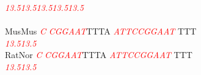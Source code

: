 \documentclass[11pt,twoside,reqno,a4paper]{article}
\begin{document}
{\hspace*{7\charwidth}\hspace*{1\charwidth}\textit{\textcolor{red}{13.5}}\hspace*{1\charwidth}\hspace*{10\charwidth}\textit{\textcolor{red}{13.5}}\hspace*{1\charwidth}\hspace*{10\charwidth}\textit{\textcolor{red}{13.5}}\hspace*{1\charwidth}\hspace*{1\charwidth}\hspace*{10\charwidth}\textit{\textcolor{red}{13.5}}\hspace*{1\charwidth}\hspace*{10\charwidth}\textit{\textcolor{red}{13.5}}\hspace*{1\charwidth}\\
\\
MusMus	\textit{\textcolor{red}{C}}	\textit{\textcolor{red}{C}}\textit{\textcolor{red}{G}}\textit{\textcolor{red}{G}}\textit{\textcolor{red}{A}}\textit{\textcolor{red}{A}}\textit{\textcolor{red}{T}}TTTA	\textit{\textcolor{red}{A}}\textit{\textcolor{red}{T}}\textit{\textcolor{red}{T}}\textit{\textcolor{red}{C}}\textit{\textcolor{red}{C}}\textit{\textcolor{red}{G}}\textit{\textcolor{red}{G}}\textit{\textcolor{red}{A}}\textit{\textcolor{red}{A}}\textit{\textcolor{red}{T}}	TTT\\
\hspace*{7\charwidth}\hspace*{0\charwidth}\textit{\textcolor{red}{13.5}}\hspace*{1\charwidth}\hspace*{1\charwidth}\hspace*{7\charwidth}\textit{\textcolor{red}{13.5}}\hspace*{1\charwidth}\\
RatNor	\textit{\textcolor{red}{C}}	\textit{\textcolor{red}{C}}\textit{\textcolor{red}{G}}\textit{\textcolor{red}{G}}\textit{\textcolor{red}{A}}\textit{\textcolor{red}{A}}\textit{\textcolor{red}{T}}TTTA	\textit{\textcolor{red}{A}}\textit{\textcolor{red}{T}}\textit{\textcolor{red}{T}}\textit{\textcolor{red}{C}}\textit{\textcolor{red}{C}}\textit{\textcolor{red}{G}}\textit{\textcolor{red}{G}}\textit{\textcolor{red}{A}}\textit{\textcolor{red}{A}}\textit{\textcolor{red}{T}}	TTT\\
\hspace*{7\charwidth}\hspace*{0\charwidth}\textit{\textcolor{red}{13.5}}\hspace*{1\charwidth}\hspace*{1\charwidth}\hspace*{7\charwidth}\textit{\textcolor{red}{13.5}}\hspace*{1\charwidth}\\
}
\end{document}
